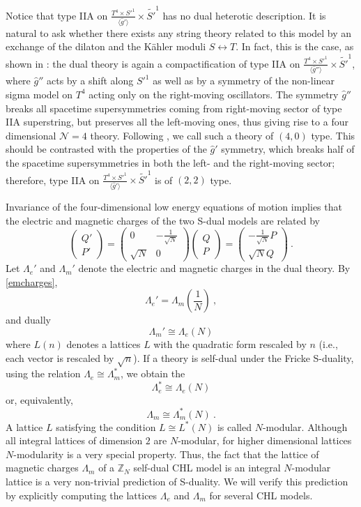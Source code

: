 \documentclass[a4paper,11pt]{article}
\newcommand{\ZZ}{\mathbb{Z}}
\newcommand{\N}{\mathcal{N}}
\numberwithin{equation}{section}
\def\be{\begin{equation}}
\def\ee{\end{equation}}
\begin{document}
Notice that type IIA on $\frac{T^4\times {S'}^1}{\langle\hat g' \rangle}\times \tilde {S'}^1$ has no dual heterotic description. It is natural to ask whether there exists any string theory related to this model by an exchange of the dilaton and the K\"ahler moduli $S\leftrightarrow T$. In fact, this is the case, as shown in \cite{Sen:1995ff}: the dual theory is again a compactification of type IIA on $\frac{T^4\times {S'}^1}{\langle\hat g'' \rangle}\times \tilde {S'}^1$, where $\hat g''$ acts by a shift along ${S'}^1$ as well as by a symmetry of the non-linear sigma model on $T^4$ acting only on the right-moving oscillators. The symmetry $\hat g''$ breaks all spacetime supersymmetries coming from right-moving sector of type IIA superstring, but preserves all the left-moving ones, thus giving rise to a four dimensional $\N=4$ theory. Following \cite{Sen:1995ff}, we call such a theory of $(4,0)$ type.  This should be contrasted with the properties of the $\hat g'$ symmetry, which breaks half of the spacetime supersymmetries in both the left- and the right-moving sector; therefore, type IIA on $\frac{T^4\times {S'}^1}{\langle\hat g' \rangle}\times \tilde {S'}^1$ is of $(2,2)$ type. 


\bigskip

Invariance of the four-dimensional low energy equations of motion implies that the electric and magnetic charges of the two S-dual models are related by
\be\label{emcharges}  \begin{pmatrix}
Q'\\ P'
\end{pmatrix}= \begin{pmatrix}
0 & -\frac{1}{\sqrt{N}}\\ \sqrt{N} & 0
\end{pmatrix}\begin{pmatrix}
Q\\ P
\end{pmatrix}=\begin{pmatrix}
-\frac{1}{\sqrt{N}}P\\ \sqrt{N} Q
\end{pmatrix}
\ .\ee 
Let $\Lambda_e'$ and $\Lambda_m'$ denote the electric and magnetic charges in the dual theory. By \eqref{emcharges},
\be\label{duallatte}  \Lambda_e'=\Lambda_m(\frac{1}{N})\ ,
\ee and dually
\be\label{duallattm} \Lambda_m'\cong \Lambda_e(N)
\ee
 where $L(n)$ denotes a lattices $L$ with the quadratic form rescaled by $n$ (i.e., each vector is rescaled by $\sqrt{n}$). If a theory is self-dual under the Fricke S-duality, using the relation $\Lambda_e\cong \Lambda_m^*$, we obtain the
 \be \Lambda_e^*\cong \Lambda_e(N)
 \ee or, equivalently,
  \be \Lambda_m\cong \Lambda_m^*(N)\ .
 \ee
  A lattice $L$ satisfying the condition $L\cong L^*(N)$ is called $N$-modular. Although all integral lattices of dimension $2$ are $N$-modular, for higher dimensional lattices $N$-modularity is a very special property. Thus, the fact that the lattice of magnetic charges $\Lambda_m$ of a $\ZZ_N$ self-dual CHL model is an integral $N$-modular lattice is a very non-trivial prediction of S-duality. We will verify this prediction by explicitly computing the lattices $\Lambda_e$ and $\Lambda_m$ for several CHL models.
 
\end{document}
